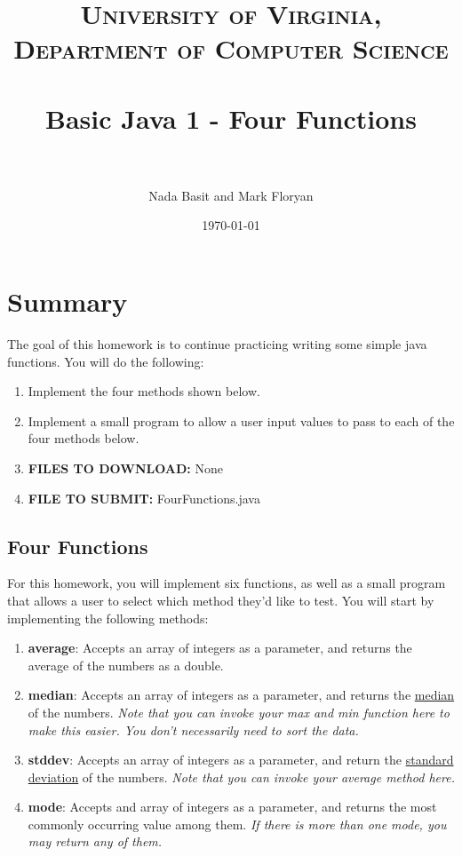 \documentclass[paper=a4, fontsize=11pt, parskip=full]{scrartcl} %
\title{	
\normalfont \normalsize 
\textsc{University of Virginia, Department of Computer Science} \\ [25pt] %
\horrule{0.5pt} \\[0.4cm] %
\huge Basic Java 1 - Four Functions \\ %
\horrule{2pt} \\[0.5cm] %
}
\author{Nada Basit and Mark Floryan}
\date{\normalsize\today} %
\numberwithin{equation}{section} %
\numberwithin{figure}{section} %
\numberwithin{table}{section} %
\begin{document}
\maketitle %

\section{Summary}

The goal of this homework is to continue practicing writing some simple java functions. You will do the following:

\begin{enumerate}
	\item Implement the four methods shown below.
	\item Implement a small program to allow a user input values to pass to each of the four methods below.
	\item \textbf{FILES TO DOWNLOAD:} None
	\item \textbf{FILE TO SUBMIT:} FourFunctions.java
\end{enumerate}

\subsection{Four Functions}

For this homework, you will implement six functions, as well as a small program that allows a user to select which method they'd like to test. You will start by implementing the following methods:

\begin{enumerate}
\item \textbf{average}: Accepts an array of integers as a parameter, and returns the average of the numbers as a double.
\item \textbf{median}: Accepts an array of integers as a parameter, and returns the \href{https://en.wikipedia.org/wiki/Median}{median} of the numbers. \emph{Note that you can invoke your max and min function here to make this easier. You don't necessarily need to sort the data.} 
\item \textbf{stddev}: Accepts an array of integers as a parameter, and return the \href{https://en.wikipedia.org/wiki/Standard_deviation}{standard deviation} of the numbers. \emph{Note that you can invoke your average method here.}
\item \textbf{mode}: Accepts and array of integers as a parameter, and returns the most commonly occurring value among them. \emph{If there is more than one mode, you may return any of them.}
\end{enumerate}
\end{document}
